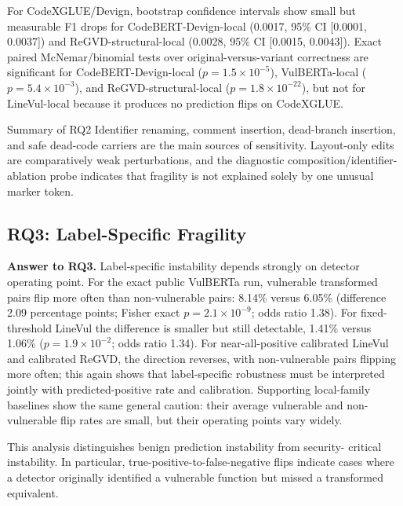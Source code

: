 \documentclass[a4paper,fleqn]{cas-dc}
\begin{document}
For CodeXGLUE/Devign, bootstrap confidence intervals show small but measurable
F1 drops for CodeBERT-Devign-local (0.0017, 95\% CI [0.0001, 0.0037]) and
ReGVD-structural-local (0.0028, 95\% CI [0.0015, 0.0043]). Exact paired
McNemar/binomial tests over original-versus-variant correctness are significant
for CodeBERT-Devign-local ($p=1.5\times 10^{-5}$), VulBERTa-local
($p=5.4\times 10^{-3}$), and ReGVD-structural-local
($p=1.8\times 10^{-22}$), but not for LineVul-local because it produces no
prediction flips on CodeXGLUE.

\begin{rqsummarybox}{Summary of RQ2}
Identifier renaming, comment insertion, dead-branch insertion, and safe
dead-code carriers are the main sources of sensitivity. Layout-only edits are
comparatively weak perturbations, and the diagnostic
composition/identifier-ablation probe indicates that fragility is not explained
solely by one unusual marker token.
\end{rqsummarybox}

\subsection{RQ3: Label-Specific Fragility}

\textbf{Answer to RQ3.} Label-specific instability depends strongly on detector
operating point. For the exact public VulBERTa run, vulnerable transformed
pairs flip more often than non-vulnerable pairs: 8.14\% versus 6.05\%
(difference 2.09 percentage points; Fisher exact $p=2.1\times 10^{-9}$; odds
ratio 1.38). For fixed-threshold LineVul the difference is smaller but still
detectable, 1.41\% versus 1.06\% ($p=1.9\times 10^{-2}$; odds ratio 1.34).
For near-all-positive calibrated LineVul and calibrated ReGVD, the direction
reverses, with non-vulnerable pairs flipping more often; this again shows that
label-specific robustness must be interpreted jointly with predicted-positive
rate and calibration. Supporting local-family baselines show the same general
caution: their average vulnerable and non-vulnerable flip rates are small, but
their operating points vary widely.

This analysis distinguishes benign prediction instability from security-
critical instability. In particular, true-positive-to-false-negative flips
indicate cases where a detector originally identified a vulnerable function
but missed a transformed equivalent.
\end{document}
